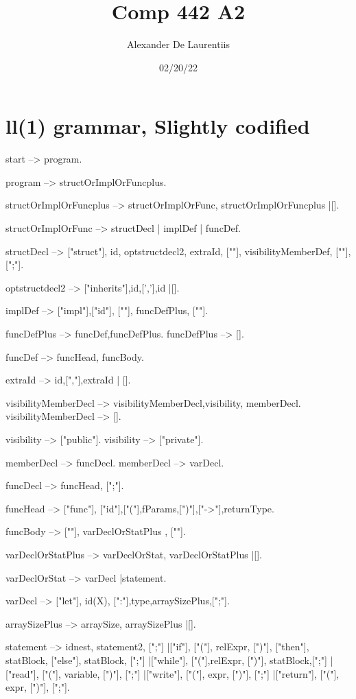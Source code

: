 \documentclass{article}
\author{Alexander De Laurentiis}
\title{Comp 442 A2}
\date{02/20/22}
\begin{document}
\maketitle

\section{ll(1) grammar, Slightly codified}

start --> program.

program --> structOrImplOrFuncplus.

structOrImplOrFuncplus --> structOrImplOrFunc, structOrImplOrFuncplus
			   |[].

structOrImplOrFunc --> structDecl
		       | implDef
		       | funcDef.

structDecl --> ["struct"], id, optstructdecl2, extraId,
	       ["{"],
	       visibilityMemberDef,
	       ["}"],[";"].

optstructdecl2 --> ["inherits"],id,[','],id
		   |[].

implDef --> ["impl"],["id"],
	       ["{"],
	       funcDefPlus,
	       ["}"].


funcDefPlus --> funcDef,funcDefPlus.
funcDefPlus --> [].

funcDef --> funcHead, funcBody.

extraId --> id,[","],extraId
	    | [].

visibilityMemberDecl -->  visibilityMemberDecl,visibility, memberDecl.
visibilityMemberDecl --> [].

visibility --> ["public"].
visibility --> ["private"].

memberDecl --> funcDecl.
memberDecl --> varDecl.

funcDecl --> funcHead, [";"].

funcHead --> ["func"], ["id"],["("],fParams,[")"],["->"],returnType.

funcBody --> ["{"], varDeclOrStatPlus , ["}"].

varDeclOrStatPlus --> varDeclOrStat, varDeclOrStatPlus
		      |[].

varDeclOrStat --> varDecl
		  |statement.

varDecl --> ["let"], id(X), [":"],type,arraySizePlus,[";"].

arraySizePlus --> arraySize, arraySizePlus
		  |[].

statement --> idnest, statement2, [";"]
	      |["if"], ["("], relExpr, [")"],
	      ["then"], statBlock,
	      ["else"], statBlock, [";"]
	      |["while"], ["("],relExpr, [")"],
	      statBlock,[";"]
	      |["read"], ["("], variable, [")"], [";"]
	      |["write"], ["("], expr, [")"], [";"]
	      |["return"], ["("], expr, [")"], [";"].
\end{document}
